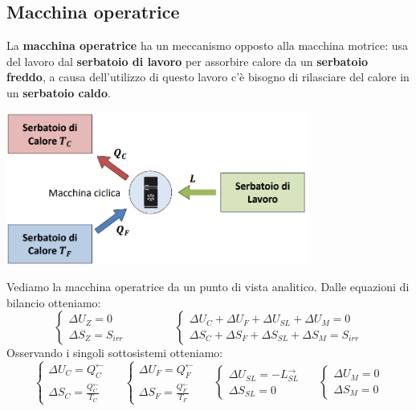 \subsection{Macchina operatrice}
La \textbf{macchina operatrice} ha un meccanismo opposto alla macchina motrice: usa del lavoro dal \textbf{serbatoio di lavoro} per assorbire calore da un \textbf{serbatoio freddo}, a causa dell'utilizzo di questo lavoro c'è bisogno di rilasciare del calore in un \textbf{serbatoio caldo}.
\begin{center}
    \includegraphics[height=5cm]{../L05/img3.PNG}
\end{center}
Vediamo la macchina operatrice da un punto di vista analitico.\newline
Dalle equazioni di bilancio otteniamo:
\[
    \begin{cases}
        \Delta U_Z = 0\\ \Delta S_Z = S_{irr}
    \end{cases} \;\;\;\;\;\;\;\;\;\;\;\;\;\;\; \begin{cases}
        \Delta U_C + \Delta U_F + \Delta U_{SL} + \Delta U_M = 0 \\
        \Delta S_C + \Delta S_F + \Delta S_{SL} + \Delta S_M = S_{irr}
    \end{cases}
\]
Osservando i singoli sottosistemi otteniamo:
\[
    \begin{cases}
        \Delta U_C = Q_C^\leftarrow \\ \Delta S_C = \frac{Q_C^\leftarrow }{T_C}
    \end{cases} \;\;\;\;\; \begin{cases}
        \Delta U_F = Q_F^\leftarrow \\ \Delta S_F = \frac{Q_F^\leftarrow}{T_F}
    \end{cases} \;\;\;\;\; \begin{cases}
        \Delta U_{SL} = - L_{SL}^\rightarrow \\ \Delta S_{SL} = 0
    \end{cases} \;\;\;\;\; \begin{cases}
        \Delta U_M = 0\\ \Delta S_M = 0
    \end{cases}
\]
